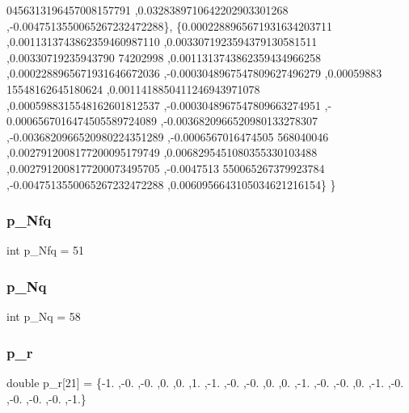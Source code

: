 \begin{DoxyCode}
      0456313196457008157791 ,0.0328389710642202903301268 ,-0.0047513550065267232472288\},
\{0.0002288965671931634203711 ,0.0011313743862359460987110 ,0.0033071923594379130581511 ,0.00330719235943790
      74202998 ,0.0011313743862359434966258 ,0.0002288965671931646672036 ,-0.0003048967547809627496279 ,0.00059883
      15548162645180624 ,0.0011418850411246943971078 ,0.0005988315548162601812537 ,-0.0003048967547809663274951 ,-
      0.0006567016474505589724089 ,-0.0036820966520980133278307 ,-0.0036820966520980224351289 ,-0.0006567016474505
      568040046 ,0.0027912008177200095179749 ,0.0068295451080355330103488 ,0.0027912008177200073495705 ,-0.0047513
      550065267379923784 ,-0.0047513550065267232472288 ,0.0060956643105034621216154\}
\}
\end{DoxyCode}
\mbox{\label{a00458_aa030b0a9fe619a48647119bacea600e0}} 
\subsubsection{\texorpdfstring{p\+\_\+\+Nfq}{p\_Nfq}}
{\footnotesize\ttfamily int p\+\_\+\+Nfq = 51}

\mbox{\label{a00458_a207fd9268dfef5bf1505928a4f4c774a}} 
\subsubsection{\texorpdfstring{p\+\_\+\+Nq}{p\_Nq}}
{\footnotesize\ttfamily int p\+\_\+\+Nq = 58}

\mbox{\label{a00458_af8a639c6d56c6c59b53ab16bd5443ad3}} 
\subsubsection{\texorpdfstring{p\+\_\+r}{p\_r}}
{\footnotesize\ttfamily double p\+\_\+r\mbox{[}21\mbox{]} = \{-\/1. ,-\/0. ,-\/0. ,0. ,0. ,1. ,-\/1. ,-\/0. ,-\/0. ,0. ,0. ,-\/1. ,-\/0. ,-\/0. ,0. ,-\/1. ,-\/0. ,-\/0. ,-\/0. ,-\/0. ,-\/1.\}}

